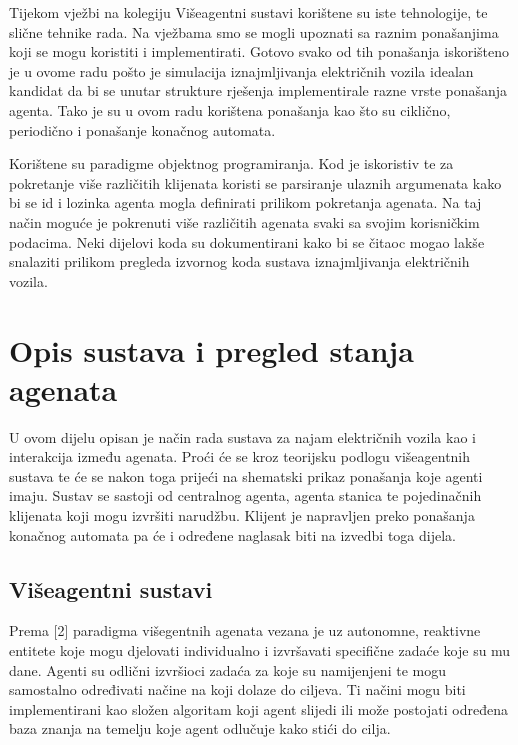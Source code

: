 \documentclass{foi}
\begin{document}
Tijekom vježbi na kolegiju Višeagentni sustavi korištene su iste tehnologije, te slične tehnike rada. Na vježbama smo se mogli upoznati sa raznim ponašanjima koji se mogu koristiti i implementirati. Gotovo svako od tih ponašanja iskorišteno je u ovome radu pošto je simulacija iznajmljivanja električnih vozila idealan kandidat da bi se unutar strukture rješenja implementirale razne vrste ponašanja agenta. Tako je su u ovom radu korištena ponašanja kao što su ciklično, periodično i ponašanje konačnog automata. 

Korištene su paradigme objektnog programiranja. Kod je iskoristiv te za pokretanje više različitih klijenata koristi se parsiranje ulaznih argumenata kako bi se id i lozinka agenta mogla definirati prilikom pokretanja agenata. Na taj način moguće je pokrenuti više različitih agenata svaki sa svojim korisničkim podacima. Neki dijelovi koda su dokumentirani kako bi se čitaoc mogao lakše snalaziti prilikom pregleda izvornog koda sustava iznajmljivanja električnih vozila.

\chapter{Opis sustava i pregled stanja agenata}

U ovom dijelu opisan je način rada sustava za najam električnih vozila kao i interakcija između agenata. Proći će se kroz teorijsku podlogu višeagentnih sustava te će se nakon toga prijeći na shematski prikaz ponašanja koje agenti imaju. Sustav se sastoji od centralnog agenta, agenta stanica te pojedinačnih klijenata koji mogu izvršiti narudžbu. Klijent je napravljen preko ponašanja konačnog automata pa će i određene naglasak biti na izvedbi toga dijela.

\section{Višeagentni sustavi}

Prema [2] paradigma višegentnih agenata vezana je uz autonomne, reaktivne entitete koje mogu djelovati individualno i izvršavati specifične zadaće koje su mu dane. Agenti su odlični izvršioci zadaća za koje su namijenjeni te mogu samostalno određivati načine na koji dolaze do ciljeva. Ti načini mogu biti implementirani kao složen algoritam koji agent slijedi ili može postojati određena baza znanja na temelju koje agent odlučuje kako stići do cilja.
\end{document}
